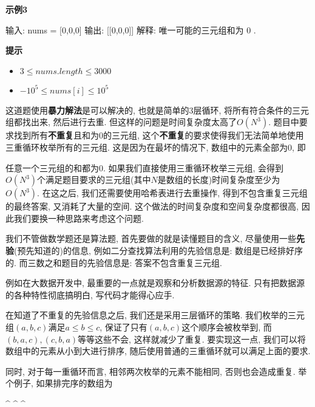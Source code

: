 \documentclass[oneside]{ctexbook}
\begin{document}
{\textbf{示例3}

\begin{mytext}
输入: nums = [0,0,0]
输出: [[0,0,0]]
解释: 唯一可能的三元组和为 0 .
\end{mytext}

\textbf{提示}

\begin{itemize}
    \item $3 \leq nums.length \leq 3000$
    \item $-10^5 \leq nums[i] \leq 10^5$
\end{itemize}

这道题使用\textbf{暴力解法}是可以解决的, 也就是简单的3层循环, 将所有符合条件的三元组都找出来, 然后进行去重. 但这样的问题是时间复杂度太高了$O(N^3)$. 题目中要求找到所有\textbf{不重复}且和为$0$的三元组, 这个\textbf{不重复}的要求使得我们无法简单地使用三重循环枚举所有的三元组. 这是因为在最坏的情况下, 数组中的元素全部为$0$, 即

\begin{mytext}
[0, 0, 0, 0, 0, ..., 0, 0, 0]
\end{mytext}

任意一个三元组的和都为$0$. 如果我们直接使用三重循环枚举三元组, 会得到$O(N^3)$个满足题目要求的三元组(其中$N$是数组的长度)时间复杂度至少为$O(N^3)$. 在这之后, 我们还需要使用哈希表进行去重操作, 得到不包含重复三元组的最终答案, 又消耗了大量的空间. 这个做法的时间复杂度和空间复杂度都很高, 因此我们要换一种思路来考虑这个问题.

我们不管做数学题还是算法题, 首先要做的就是读懂题目的含义, 尽量使用一些\textbf{先验}(预先知道的)的信息, 例如二分查找算法利用的先验信息是: 数组是已经排好序的. 而三数之和题目的先验信息是: 答案不包含重复三元组.

\begin{marker}
例如在大数据开发中, 最重要的一点就是观察和分析数据源的特征. 只有把数据源的各种特性彻底搞明白, 写代码才能得心应手.
\end{marker}

在知道了不重复的先验信息之后, 我们还是采用三层循环的策略. 我们枚举的三元组$(a,b,c)$满足$a\leq b\leq c$, 保证了只有$(a,b,c)$这个顺序会被枚举到, 而$(b,a,c), (c,b,a)$等等这些不会, 这样就减少了重复. 要实现这一点, 我们可以将数组中的元素从小到大进行排序, 随后使用普通的三重循环就可以满足上面的要求.

同时, 对于每一重循环而言, 相邻两次枚举的元素不能相同, 否则也会造成重复. 举个例子, 如果排完序的数组为

\begin{mytext}
[0, 1, 2, 2, 2, 3]
 ^  ^  ^
\end{mytext}

}
\end{document}

